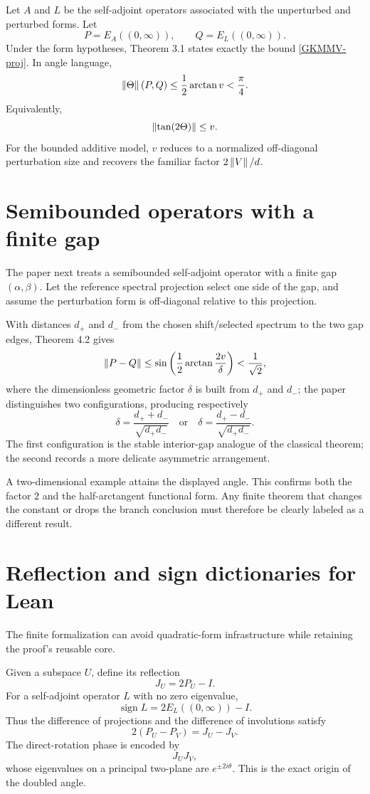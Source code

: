 Let $A$ and $L$ be the self-adjoint operators associated with the unperturbed and perturbed forms. Let
\[
 P=E_A((0,\infty)),
 \qquad
 Q=E_L((0,\infty)).
\]
Under the form hypotheses, Theorem 3.1 states exactly the bound \eqref{GKMMV-proj}. In angle language,
\[
 \left\lVert \Theta\right\rVert(P,Q)
 \le
 \frac12\arctan v
 <\frac{\pi}{4}.
\]
Equivalently,
\[
 \left\lVert \tan(2\Theta)\right\rVert\le v.
\]
For the bounded additive model, $v$ reduces to a normalized off-diagonal perturbation size and recovers the familiar factor $2\left\lVert V\right\rVert/d$.

\section{Semibounded operators with a finite gap}

The paper next treats a semibounded self-adjoint operator with a finite gap $(\alpha,\beta)$. Let the reference spectral projection select one side of the gap, and assume the perturbation form is off-diagonal relative to this projection.

With distances $d_+$ and $d_-$ from the chosen shift/selected spectrum to the two gap edges, Theorem 4.2 gives
\[
 \left\lVert P-Q\right\rVert
 \le
 \sin\left(
   \frac12\arctan\frac{2v}{\delta}
 \right)
 <\frac1{\sqrt2},
\]
where the dimensionless geometric factor $\delta$ is built from $d_+$ and $d_-$; the paper distinguishes two configurations, producing respectively
\[
 \delta=\frac{d_++d_-}{\sqrt{d_+d_-}}
 \quad\text{or}\quad
 \delta=\frac{d_+-d_-}{\sqrt{d_+d_-}}.
\]
The first configuration is the stable interior-gap analogue of the classical theorem; the second records a more delicate asymmetric arrangement.

A two-dimensional example attains the displayed angle. This confirms both the factor $2$ and the half-arctangent functional form. Any finite theorem that changes the constant or drops the branch conclusion must therefore be clearly labeled as a different result.

\section{Reflection and sign dictionaries for Lean}

The finite formalization can avoid quadratic-form infrastructure while retaining the proof's reusable core.

Given a subspace $U$, define its reflection
\[
 J_U=2P_U-I.
\]
For a self-adjoint operator $L$ with no zero eigenvalue,
\[
 \operatorname{sign} L=2E_L((0,\infty))-I.
\]
Thus the difference of projections and the difference of involutions satisfy
\[
 2(P_U-P_V)=J_U-J_V.
\]
The direct-rotation phase is encoded by
\[
 J_UJ_V,
\]
whose eigenvalues on a principal two-plane are $e^{\pm2i\theta}$. This is the exact origin of the doubled angle.

